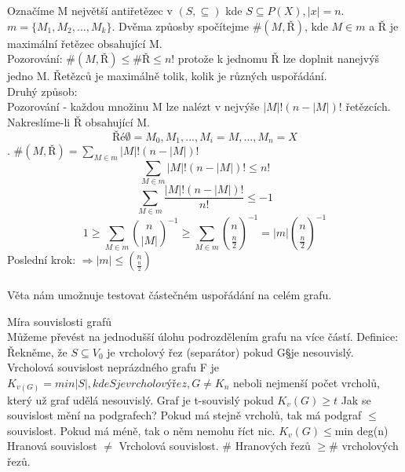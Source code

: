 \documentclass{article}
\begin{document}
Označíme M největší antiřetězec v $(S, \subseteq)$ kde $S \subseteq P(X), |x| = n$.
$m = \{M_{1},M_{2},...,M_{k}\}$. Dvěma způosby spočítejme $\#(M,Ř)$, kde $M \in m$ a $Ř$ je maximální
řetězec obsahující M.\\
Pozorování: $\#(M,Ř) \leq \#Ř \leq n!$ protože k jednomu Ř lze doplnit nanejvýš jedno M. Řetězců je maximálně tolik,
kolik je různých uspořádání. \\
Druhý způsob: \\
Pozorování - každou množinu M lze nalézt v nejvýše $|M|!(n-|M|)!$ řetězcích. Nakreslíme-li Ř obsahující M.\\
$$Ř é \emptyset = M_{0},M_{1},...,M_{i}=M,...,M_{n}=X$$. $\#(M,Ř) = \sum_{M \in m} |M|!(n-|M|)!$\\
$$\sum_{M \in m} |M|!(n-|M|)! \leq n!$$
$$\sum_{M \in m} \frac{|M|!(n-|M|)!}{n!} \leq -1$$
$$1 \geq \sum_{M \in m} \binom{n}{|M|}^{-1} \geq \sum_{M \in m} \binom{n}{\frac{n}{2}}^{-1} = |m| \binom{n}{\frac{n}{2}}^{-1}$$
Poslední krok: $ \Rightarrow  |m| \leq \binom{n}{\frac{n}{2}}$\\\\
Věta nám umožnuje testovat částečném uspořádání na celém grafu.

Míra souvislosti grafů\\
Můžeme převést na jednodušší úlohu podrozdělením grafu na více částí.
Definice: Řekněme, že $S \subseteq V_{0}$ je vrcholový řez (separátor) pokud G\S je nesouvislý.
Vrcholová souvislost neprázdného grafu F je $K_{v(G)} = min|S|, kde S je vrcholový řez, G\neq K_{n}$ neboli nejmenší počet vrcholů, který už graf udělá nesouvislý.
Graf je t-souvislý pokud $K_{v}(G)\geq t$
Jak se souvislost mění na podgrafech?
Pokud má stejně vrcholů, tak má podgraf $\leq$ souvislost.
Pokud má méně, tak o něm nemohu říct nic.
$K_{v}(G) \leq $min deg(n) 
Hranová souvislost $\neq$ Vrcholová souvislost.
$\#$ Hranových řezů $\geq \#$ vrcholových řezů.
\end{document}
